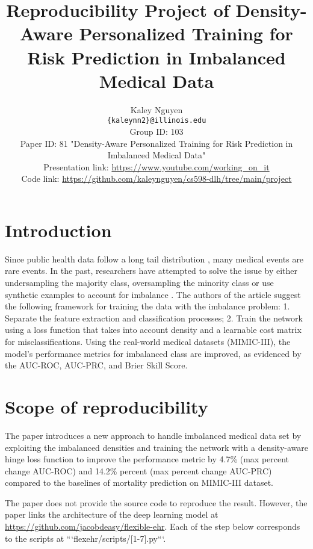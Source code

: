\documentclass[11pt,a4paper]{article}
\title{Reproducibility Project of Density-Aware Personalized Training for Risk Prediction in Imbalanced Medical Data}
\author{Kaley Nguyen \\
  \texttt{\{kaleynn2\}@illinois.edu}
  \\[2em]
  Group ID: 103\\
  Paper ID: 81 "Density-Aware Personalized Training for Risk Prediction in Imbalanced Medical Data" \cite{huo2022densityaware}\\
  Presentation link: \url{https://www.youtube.com/working_on_it} \\
  Code link: \url{https://github.com/kaleynguyen/cs598-dlh/tree/main/project}}
\begin{document}
\maketitle


\section{Introduction}
Since public health data follow a long tail distribution \cite{longtail}, many medical events are rare events. In the past, researchers have attempted to solve the issue by either undersampling the majority class, oversampling the minority class \cite{sampling} or use synthetic examples to account for imbalance \cite{smote}. The authors of the article suggest the following framework for training the data with the imbalance problem: 1. Separate the feature extraction and classification processes; 2. Train the network using a loss function that takes into account density and a learnable cost matrix for misclassifications. Using the real-world medical datasets (MIMIC-III), the model's performance metrics for imbalanced class are improved, as evidenced by the AUC-ROC, AUC-PRC, and Brier Skill Score.

\section{Scope of reproducibility}

The paper introduces a new approach to handle imbalanced medical data set by exploiting the imbalanced densities and training the network with a density-aware hinge loss function to improve the performance metric by 4.7\% (max percent change AUC-ROC) and 14.2\% percent (max percent change AUC-PRC) compared to the baselines of mortality prediction on MIMIC-III dataset. 

The paper does not provide the source code to reproduce the result. However, the paper links the architecture of the deep learning model \cite{deasy2019impact} at \url{https://github.com/jacobdeasy/flexible-ehr}. Each of the step below corresponds to the scripts at ```flexehr/scripts/[1-7].py```.
\end{document}
